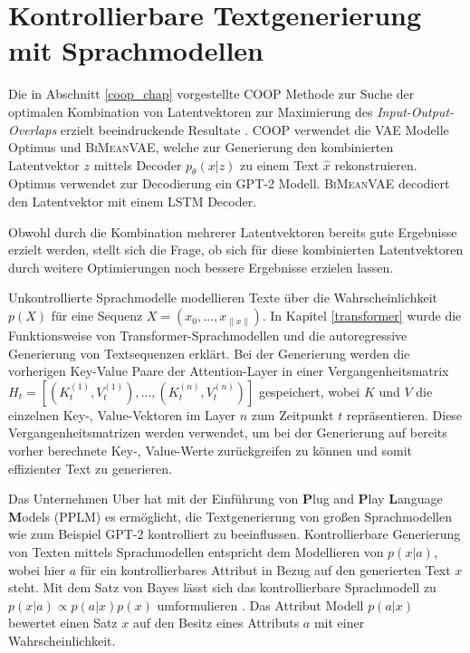 \section{Kontrollierbare Textgenerierung mit Sprachmodellen}\raggedbottom
\label{pplm_chap}
Die in Abschnitt \ref{coop_chap} vorgestellte COOP Methode zur Suche der optimalen Kombination von Latentvektoren zur Maximierung des \textit{Input-Output-Overlaps} erzielt beeindruckende Resultate \citep{coop}.
COOP verwendet die VAE Modelle Optimus und \textsc{BiMeanVAE}, welche zur Generierung den kombinierten Latentvektor $z$ mittels Decoder $p_\theta(x|z)$ zu einem Text $\hat{x}$ rekonstruieren.
Optimus verwendet zur Decodierung ein GPT-2 Modell. \textsc{BiMeanVAE} decodiert den Latentvektor mit einem LSTM Decoder.

Obwohl durch die Kombination mehrerer Latentvektoren bereits gute Ergebnisse erzielt werden, stellt sich die Frage, ob sich für diese kombinierten Latentvektoren durch weitere Optimierungen noch bessere Ergebnisse erzielen lassen.

Unkontrollierte Sprachmodelle modellieren Texte über die Wahrscheinlichkeit $p(X)$ für eine Sequenz $X=(x_0,...,x_{\| x \|})$.
In Kapitel \ref{transformer} wurde die Funktionsweise von Transformer-Sprachmodellen und die autoregressive Generierung von Textsequenzen erklärt. 
Bei der Generierung werden die vorherigen Key-Value Paare der Attention-Layer in einer Vergangenheitsmatrix $H_t = [(K_t^{(1)},V_t^{(1)}), \ldots , (K_t^{(n)},V_t^{(n)})]$ gespeichert, wobei $K$ und $V$ die einzelnen Key-, Value-Vektoren im Layer $n$ zum Zeitpunkt $t$ repräsentieren. %
Diese Vergangenheitsmatrizen werden verwendet, um bei der Generierung auf bereits vorher berechnete Key-, Value-Werte zurückgreifen zu können und somit effizienter Text zu generieren.


Das Unternehmen Uber hat mit der Einführung von \textbf{P}lug and \textbf{P}lay \textbf{L}anguage \textbf{M}odels (PPLM) \citep{DBLP:journals/corr/abs-1912-02164} es ermöglicht, die Textgenerierung von großen Sprachmodellen wie zum Beispiel GPT-2 kontrolliert zu beeinflussen.
Kontrollierbare Generierung von Texten mittels Sprachmodellen entspricht dem Modellieren von $p(x|a)$, wobei hier $a$ für ein kontrollierbares Attribut in Bezug auf den generierten Text $x$ steht. 
Mit dem Satz von Bayes lässt sich das kontrollierbare Sprachmodell zu $p(x|a)\propto p(a|x)p(x)$ umformulieren \citep{DBLP:journals/corr/abs-1912-02164}. 
Das Attribut Modell $p(a|x)$ bewertet einen Satz $x$ auf den Besitz eines Attributs $a$ mit einer Wahrscheinlichkeit.


